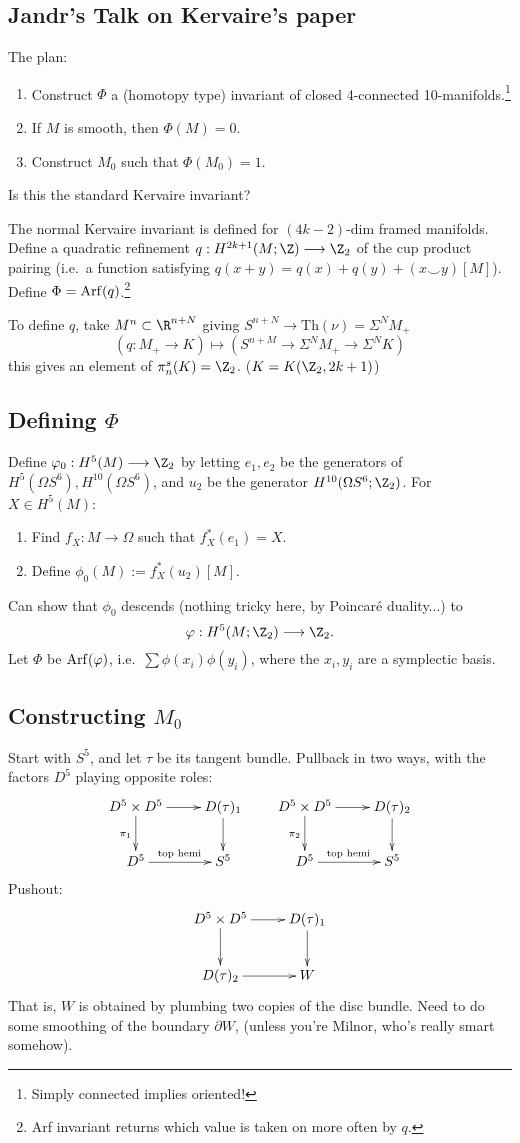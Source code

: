 \documentclass[11pt]{article}
\newcommand{\KanSemResponse}[1]
{
\thispagestyle{fancy}
\subsection*{#1}
}
\begin{document}
\begin{JandrKervaire}
\KanSemResponse
{Jandr's Talk on Kervaire's paper}
The plan:
\begin{enumerate}
\item Construct $\Phi$ a (homotopy type) invariant of closed 4-connected 10-manifolds.\footnote{Simply connected implies oriented!}
\item If $M$ is smooth, then $\Phi(M)=0$.
\item Construct $M_0$ such that $\Phi(M_0)=1$.
\end{enumerate}
\begin{question}
Is this the standard Kervaire invariant?
\end{question}
The normal Kervaire invariant is defined for $(4k-2)$-dim framed manifolds. Define a quadratic refinement $q:H^{2k+1}(M;\Z)\to\Z_2$ of the cup product pairing (i.e.\ a function satisfying $q(x+y)=q(x)+q(y)+(x\smile y)[M]$). Define $\Phi=\operatorname{Arf}(q)$.\footnote{Arf invariant returns which value is taken on more often by $q$.}

To define $q$, take $M^n\subset \R^{n+N}$ giving $S^{n+N}\to\text{Th}(\nu)=\Sigma^NM_+$
\[\left(q:M_+\to K\right)\mapsto(S^{n+M}\to\Sigma^NM_+\to\Sigma^NK)\]
this gives an element of $\pi_n^s(K)=\Z_2$. ($K=K(\Z_2,2k+1)$)

\subsection*{Defining $\Phi$}
Define $\phi_0:H^5(M)\to\Z_2$ by letting $e_1,e_2$ be the generators of $H^5(\Omega S^6),H^{10}(\Omega S^6)$, and $u_2$ be the generator $H^{10}(\Omega S^6;\Z_2)$. For $X\in H^5(M)$:
\begin{enumerate}
\item Find $f_X:M\to\Omega$ such that $f_X^*(e_1)=X$.
\item Define $\phi_0(M):=f^*_X(u_2)[M]$.
\end{enumerate}
Can show that $\phi_0$ descends (nothing tricky here, by Poincar\'e duality...) to
\[\phi:H^5(M;\Z_2)\to\Z_2.\]
Let $\Phi$ be $\operatorname{Arf}(\varphi)$, i.e.\ $\sum\phi(x_i)\phi(y_i)$, where the $x_i,y_i$ are a symplectic basis.
\subsection*{Constructing $M_0$}
Start with $S^5$, and let $\tau$ be its tangent bundle.  Pullback in two ways, with the factors $D^5$ playing opposite roles:
\[\xymatrix{
D^5\times D^5\ar[d]_{\pi_1}\ar[r]&D(\tau)_1\ar[d]\\
D^5\ar[r]^{\text{top hemi}}&S^5
}\qquad
\xymatrix{
D^5\times D^5\ar[d]_{\pi_2}\ar[r]&D(\tau)_2\ar[d]\\
D^5\ar[r]^{\text{top hemi}}&S^5
}\]
Pushout:
\[\xymatrix{
\ar[d]D^5\times D^5\ar[r]&D(\tau)_1\ar[d]\\
D(\tau)_2\ar[r]&W
}\]
That is, $W$ is obtained by plumbing two copies of the disc bundle.
Need to do some smoothing of the boundary $\partial W$, (unless you're Milnor, who's really smart somehow).


\end{JandrKervaire}
\end{document}
